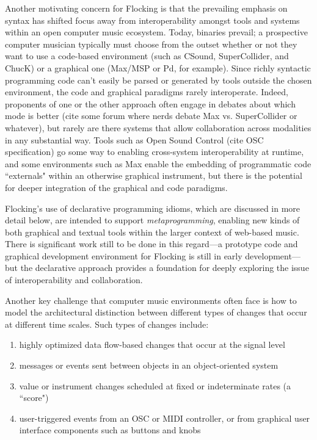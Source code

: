 \documentclass{article}
\begin{document}
Another motivating concern for Flocking is that the prevailing emphasis on syntax has shifted focus away from interoperability amongst tools and systems within an open computer music ecosystem. Today, binaries prevail; a prospective computer musician typically must choose from the outset whether or not they want to use a code-based environment (such as CSound, SuperCollider, and ChucK) or a graphical one (Max/MSP or Pd, for example). Since richly syntactic programming code can't easily be parsed or generated by tools outside the chosen environment, the code and graphical paradigms rarely interoperate. Indeed, proponents of one or the other approach often engage in debates about which mode is better (cite some forum where nerds debate Max vs. SuperCollider or whatever), but rarely are there systems that allow collaboration across modalities in any substantial way. Tools such as Open Sound Control (cite OSC specification) go some way to enabling cross-system interoperability at runtime, and some environments such as Max enable the embedding of programmatic code ``externals" within an otherwise graphical instrument, but there is the potential for deeper integration of the graphical and code paradigms.

Flocking's use of declarative programming idioms, which are discussed in more detail below, are intended to support {\it metaprogramming}, enabling new kinds of both graphical and textual tools within the larger context of web-based music. There is significant work still to be done in this regard---a prototype code and graphical development environment for Flocking is still in early development---but the declarative approach provides a foundation for deeply exploring the issue of interoperability and collaboration.

Another key challenge that computer music environments often face is how to model the architectural distinction between different types of changes that occur at different time scales. Such types of changes include:

\begin{enumerate}
\item highly optimized data flow-based changes that occur at the signal level
\item messages or events sent between objects in an object-oriented system
\item value or instrument changes scheduled at fixed or indeterminate rates (a ``score")
\item user-triggered events from an OSC or MIDI controller, or from graphical user interface components such as buttons and knobs
\end{enumerate}
\end{document}
